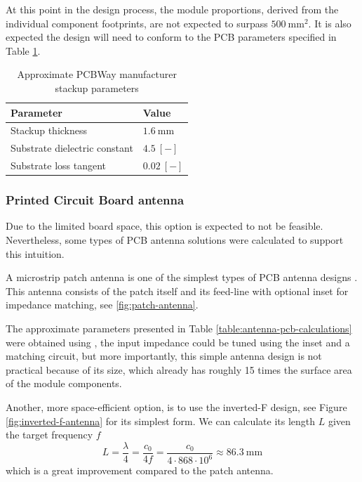 At this point in the design process, the module proportions, derived from the individual component footprints, are not expected to surpass $500~\mathrm{mm^2}$. It is also expected the design will need to conform to the PCB parameters specified in Table \ref{table:pcb-parameters}.

\begin{table}[H]
\begin{center}
\caption{\label{table:pcb-parameters}Approximate PCBWay manufacturer stackup parameters \cite{pcbway_stackup_2024}}
    \begin{tabular}{|l|l|} \hline
    \textbf{Parameter}            & \textbf{Value} \\ \hline
    Stackup thickness             & $1.6~\mathrm{mm}$ \\ \hline
    Substrate dielectric constant & $4.5~\mathrm{[-]}$ \\ \hline
    Substrate loss tangent        & $0.02~\mathrm{[-]}$ \\ \hline
    \end{tabular}
\end{center}
\end{table}

\subsubsection{Printed Circuit Board antenna}
Due to the limited board space, this option is expected to not be feasible. Nevertheless, some types of PCB antenna solutions were calculated to support this intuition.

A microstrip patch antenna is one of the simplest types of PCB antenna designs \cite{zachariah_peterson_microstrip_2022,wallace_an058_nodate}. This antenna consists of the patch itself and its feed-line with optional inset for impedance matching, see \ref{fig:patch-antenna}. 

The approximate parameters presented in Table \ref{table:antenna-pcb-calculations} were obtained using \cite{zachariah_peterson_microstrip_2022}, the input impedance could be tuned using the inset and a matching circuit, but more importantly, this simple antenna design is not practical because of its size, which already has roughly 15 times the surface area of the module components.

Another, more space-efficient option, is to use the inverted-F design, see Figure \ref{fig:inverted-f-antenna} for its simplest form. We can calculate its length $L$ given the target frequency $f$
\begin{equation}
    L = \dfrac{\lambda}{4} = \dfrac{c_0}{4f} = \dfrac{c_0}{4 \cdot 868 \cdot 10^6} \approx 86.3~\mathrm{mm}
\end{equation}
which is a great improvement compared to the patch antenna.

